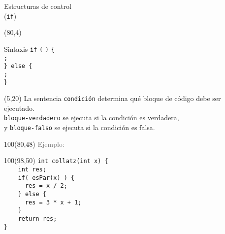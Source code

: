 \documentclass[aspectratio=169]{beamer}
\begin{document}
\begin{frame}[fragile,t]{Estructuras de control\\ (\texttt{if})}
    \begin{textblock}{60}(80,4)
    \begin{block}{\small Sintaxis}
    \vspace{0.2cm}
    \scriptsize
    {\large \texttt{if}} {\large \texttt{(}}  {\large \texttt{)}} {\large \texttt{\{}}\\ \vspace{0.2cm}
    \hspace{2cm}  {\large \texttt{;}}\\ \vspace{0.2cm}
    \hspace{1cm} {\large \texttt{\} else \{}}\\ \vspace{0.2cm}
    \hspace{2cm}  {\large \texttt{;}}\\ \vspace{0.2cm}
    \hspace{1cm} {\large \texttt{\}}}
    \end{block}
    \end{textblock}
    \begin{textblock}{50}(5,20)
    \small
    La sentencia \texttt{condición} determina qué bloque de código debe ser ejecutado.\\
    \bigskip
    \texttt{bloque-verdadero} se ejecuta si la condición es verdadera,\\
    \bigskip
    y \texttt{bloque-falso} se ejecuta si la condición es falsa.
    \end{textblock}
    \begin{textblock}{100}(80,48)
    \textcolor{gray}{Ejemplo:}
    \end{textblock}
    \begin{textblock}{100}(98,50)
    \small
    \verb|int collatz(int x) {|\\
    \verb|    int res; |\\
    \verb|    if( esPar(x) ) {|\\
    \verb|      res = x / 2;|\\
    \verb|    } else {|\\
    \verb|      res = 3 * x + 1;|\\
    \verb|    }|\\
    \verb|    return res;|\\
    \verb|}|\\
    \end{textblock}
\end{frame}
\end{document}
